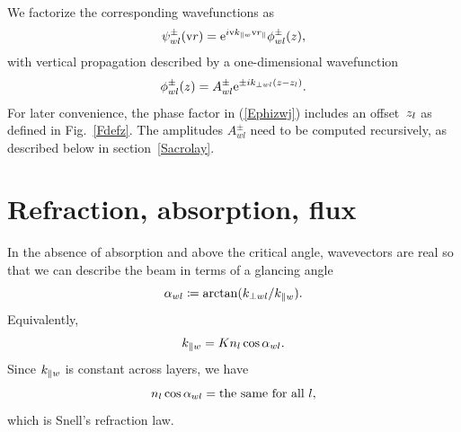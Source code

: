 We factorize the corresponding wavefunctions as
\begin{equation}\label{Eplawafa}
  \psi^\pm_{wl}(\text{v}{r})=\text{e}^{i\text{v}{k}_{\parallel w}\text{v}{r}_\parallel}\phi^\pm_{wl}(z),
\end{equation}
with vertical propagation described by a one-dimensional wavefunction
\begin{equation}\label{Ephizwj}
  \phi^\pm_{wl}(z)=A^\pm_{wl}\text{e}^{\pm ik_{\perp wl}(z-z_l)}.
\end{equation}
%
For later convenience,
the phase factor in (\ref{Ephizwj}) includes an offset~$z_l$
as defined in Fig.~\ref{Fdefz}.
%
%
%
The amplitudes $A^\pm_{wl}$ need to be computed recursively,
as described below in section~\ref{Sacrolay}.

\section{Refraction, absorption, flux}\label{Smulayabs}

In the absence of absorption and above the critical angle,
wavevectors are real
so that we can describe the beam in terms of a glancing angle
\begin{equation}\label{Edef_alpha}
  \alpha_{wl}\coloneqq \arctan(k_{\perp wl}/k_{\parallel w}).
\end{equation}
Equivalently,
\begin{equation}
  k_{\parallel w}=K n_l \cos\alpha_{wl}.
\end{equation}
Since $k_{\parallel w}$ is constant across layers,
we have
\begin{equation}\label{ESnell}
  n_l \cos\alpha_{wl} = \text{the same for all }l,
\end{equation}
which is Snell's refraction law.

